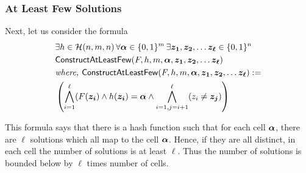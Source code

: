 \subsubsection*{At Least Few Solutions}
Next, let us consider the formula
\begin{align*}

&\exists h \in \mathcal{H}(n,m,n) \, \forall \vecbold{\alpha} \in \{0,1\}^{m} \, \exists \vecbold{z_1}, \vecbold{z_2}, \ldots \vecbold{z_{\ell}}\in\{0,1\}^n\\
&\mathsf{ConstructAtLeastFew}(F, h, m, \vecbold{\alpha},\vecbold{z_1},\vecbold{z_2}, \ldots \vecbold{z_{\ell}})\\

&\text{\it where, }

  \mathsf{ConstructAtLeastFew}(F, h, m, \vecbold{\alpha},\vecbold{z_1},\vecbold{z_2}, \ldots \vecbold{z_{\ell}}):=\\
&  \left(\bigwedge_{i=1}^{\ell} (F(\vecbold{z_i}) \wedge h(\vecbold{z_i}) = \vecbold{\alpha} \wedge \bigwedge_{i=1,j=i+1}^{\ell} ({z_i} \neq \vecbold{z_j})
  \right) 
  	\nonumber
\end{align*}





This formula says that there is a hash function such that for each cell ${\boldsymbol{\alpha}}$, there are $\ell$ solutions which all map to the cell ${\boldsymbol{\alpha}}$. Hence, if they are all distinct, in each cell the number of solutions is at least $\ell$. Thus the number of solutions is bounded below by $\ell$ times number of cells.

